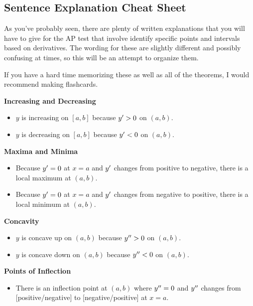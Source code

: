 \newpage

\subsection{Sentence Explanation Cheat Sheet}

As you've probably seen, there are plenty of written explanations that you will have to give for the AP test that involve identify specific points and intervals based on derivatives. The wording for these are slightly different and possibly confusing at times, so this will be an attempt to organize them.

If you have a hard time memorizing these as well as all of the theorems, I would recommend making flashcards.

\textbf{Increasing and Decreasing}

\begin{itemize}
    \item \( y \) is increasing on \( \left[ a, b \right] \) because \( y^\prime > 0 \) on \( \left( a, b \right) \).
    \item \( y \) is decreasing on \( \left[ a, b \right] \) because \( y^\prime < 0 \) on \( \left( a, b \right) \).
\end{itemize}

\textbf{Maxima and Minima}

\begin{itemize}
    \item Because \( y^\prime = 0 \) at \( x = a \) and \( y^\prime \) changes from positive to negative, there is a local maximum at \( \left( a, b \right) \).
    \item Because \( y^\prime = 0 \) at \( x = a \) and \( y^\prime \) changes from negative to positive, there is a local minimum at \( \left( a, b \right) \).
\end{itemize}

\textbf{Concavity}

\begin{itemize}
    \item \( y \) is concave up on \( \left( a, b \right) \) because \( y^{\prime\prime} > 0 \) on \( \left( a, b \right) \).
    \item \( y \) is concave down on \( \left( a, b \right) \) because \( y^{\prime\prime} < 0 \) on \( \left( a, b \right) \).
\end{itemize}

\textbf{Points of Inflection}

\begin{itemize}
    \item There is an inflection point at \( \left( a, b \right) \) where \( y^{\prime\prime} = 0 \) and \( y^{\prime\prime} \) changes from [positive/negative] to [negative/positive] at \( x = a \).
\end{itemize}

